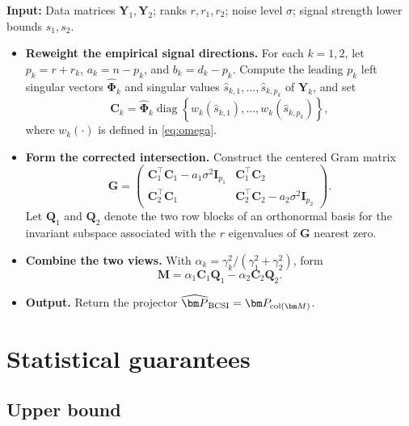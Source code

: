 \documentclass[11pt]{article}
\newcommand{\trans}{\top}
\DeclareMathOperator{\diag}{diag}
\begin{document}
\begin{algorithm}[t]
\caption{Bias-corrected subspace intersection (BCSI)}
\label{alg:bcsi}

\textbf{Input:}
Data matrices $\bm Y_1,\bm Y_2$; ranks $r,r_1,r_2$;
noise level $\sigma$; signal strength lower bounds $s_1,s_2$.
\begin{itemize}[leftmargin=1.5em]

\item \textbf{Reweight the empirical signal directions.}
For each $k=1,2$, let $p_k=r+r_k$, $a_k=n-p_k$, and
$b_k=d_k-p_k$. Compute the leading $p_k$ left singular vectors
$\widehat{\bm\Phi}_k$ and singular values
$\widehat s_{k,1},\ldots,\widehat s_{k,p_k}$ of $\bm Y_k$, and set
\[
  \bm C_k
  =
  \widehat{\bm\Phi}_k
  \diag\!\left\{
    w_k(\widehat s_{k,1}),
    \ldots,
    w_k(\widehat s_{k,p_k})
  \right\},
\]
where $w_k(\cdot)$ is defined in \eqref{eq:omega}.

\item \textbf{Form the corrected intersection.}
Construct the centered Gram matrix
\[
\bm G=
\begin{pmatrix}
\bm C_1^\trans\bm C_1-a_1\sigma^2\bm I_{p_1}
&
\bm C_1^\trans\bm C_2
\\
\bm C_2^\trans\bm C_1
&
\bm C_2^\trans\bm C_2-a_2\sigma^2\bm I_{p_2}
\end{pmatrix}.
\]
Let $\bm Q_1$ and $\bm Q_2$ denote the two row blocks of an
orthonormal basis for the invariant subspace associated with the
$r$ eigenvalues of $\bm G$ nearest zero.

\item \textbf{Combine the two views.}
With
$\alpha_k=\gamma_k^2/(\gamma_1^2+\gamma_2^2)$, form
\[
\bm M
=
\alpha_1\bm C_1\bm Q_1
-
\alpha_2\bm C_2\bm Q_2.
\]
\item \textbf{Output.}
Return the projector
$\widehat{\bm P}_{\rm BCSI}
=\bm P_{\operatorname{col}(\bm M)}$.

\end{itemize}
\end{algorithm}


\section{Statistical guarantees}

\subsection{Upper bound}
\label{sec:upper-bound}
\end{document}

